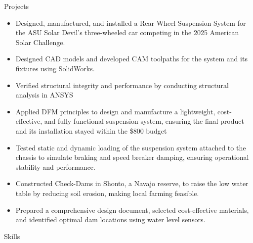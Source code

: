 \documentclass{resume}
\begin{document}
\begin{experienceSection}{Projects}
    \projectItem[
        title={Solar-Car Suspension System}, %
        duration={August 2024 – Present}, %
    ]
    \begin{itemize}
        \vspace{-0.5em}
        \itemsep -6pt {}
        \item Designed, manufactured, and installed a Rear-Wheel Suspension System for the ASU Solar Devil's three-wheeled car competing in the 2025 American Solar Challenge.
        \item Designed CAD models and developed CAM toolpaths for the system and its fixtures using SolidWorks. %
        \item Verified structural integrity and performance by conducting structural analysis in ANSYS %
        \item Applied DFM principles to design and manufacture a lightweight, cost-effective, and fully functional suspension system, ensuring the final product and its installation stayed within the \$800 budget %
        \item Tested static and dynamic loading of the suspension system attached to the chassis to simulate braking and speed breaker damping, ensuring operational stability and performance. %
    \end{itemize}

    \projectItem[
        title={Shonto Irrigation - Community service}, %
        duration={January 2022 – May 2022}, %
    ]
    \begin{itemize}
        \vspace{-0.5em}
        \itemsep -6pt {}
        \item Constructed Check-Dams in Shonto, a Navajo reserve, to raise the low water table by reducing soil erosion, making local farming feasible.
        \item Prepared a comprehensive design document, selected cost-effective materials, and identified optimal dam locations using water level sensors. %
    \end{itemize}
\end{experienceSection}

\begin{skillsSection}{\large Skills} %
    \skillItem[
        category={Design/CAE Tools},
        skills={SolidWorks (CAD, FEA), Pro E / PTC Creo, ANSYS Workbench, CATIA, Fusion 360} %
    ] \\
    \skillItem[
        category={Manufacturing},
        skills={CNC Machining, MIG & TIG Welding, 3D-printing, Power tools, GD&T} %
    ] \\
    \skillItem[
        category={Programming},
        skills={Java, Python, MATLAB, Excel VBA} %
    ] \\
     \skillItem[
        category={Languages},
        skills={English, Hindi, Kannada} %
    ]

\end{skillsSection}
\end{document}
